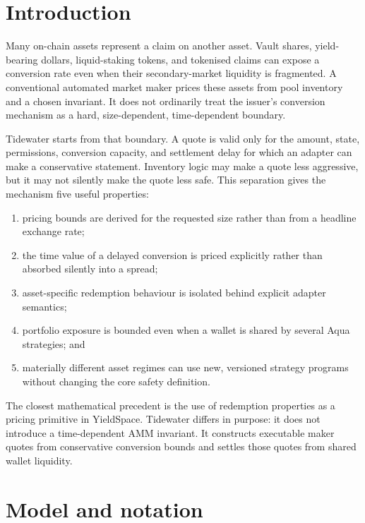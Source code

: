 \documentclass[10pt,twocolumn]{article}
\theoremstyle{definition}
\begin{document}
\section{Introduction}

Many on-chain assets represent a claim on another asset. Vault shares, yield-bearing dollars, liquid-staking
tokens, and tokenised claims can expose a conversion rate even when their secondary-market liquidity is
fragmented. A conventional automated market maker prices these assets from pool inventory and a chosen invariant.
It does not ordinarily treat the issuer's conversion mechanism as a hard, size-dependent, time-dependent boundary.

Tidewater starts from that boundary. A quote is valid only for the amount, state, permissions, conversion
capacity, and settlement delay for which an adapter can make a conservative statement. Inventory logic may make a
quote less aggressive, but it may not silently make the quote less safe. This separation gives the mechanism five
useful properties:

\begin{enumerate}[label=\arabic*.]
  \item pricing bounds are derived for the requested size rather than from a headline exchange rate;
  \item the time value of a delayed conversion is priced explicitly rather than absorbed silently into a spread;
  \item asset-specific redemption behaviour is isolated behind explicit adapter semantics;
  \item portfolio exposure is bounded even when a wallet is shared by several Aqua strategies; and
  \item materially different asset regimes can use new, versioned strategy programs without changing the core
        safety definition.
\end{enumerate}

The closest mathematical precedent is the use of redemption properties as a pricing primitive in YieldSpace.
Tidewater differs in purpose: it does not introduce a time-dependent AMM invariant. It constructs executable maker
quotes from conservative conversion bounds and settles those quotes from shared wallet liquidity.

\section{Model and notation}
\end{document}
